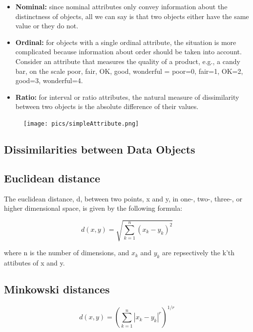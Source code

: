 		\begin{itemize}
			\item{\bf Nominal:} since nominal attributes only convey information about
			the distinctness of objects, all we can say is that two objects either have the
			same value or they do not.
			\item{\bf Ordinal:} for objects with a single ordinal attribute, the situation
			is more complicated because information about order should be taken into account.
			Consider an attribute that measures the quality of a product, e.g., a candy bar, 
			on the scale {poor, fair, OK, good, wonderful} = {poor=0, fair=1, OK=2, good=3, 
			wonderful=4}.
			\item{\bf Ratio:} for interval or ratio attributes, the natural measure of dissimilarity
			between two objects is the absolute difference of their values.
		\end{itemize}

		\begin{figure}[H]
			\texttt{[image: pics/simpleAttribute.png]}
		\end{figure}

	\subsection{Dissimilarities between Data Objects}

	\subsection*{Euclidean distance} 

	The euclidean distance, d, between two points, x and y,
	in one-, two-, three-, or higher dimensional space, is given by the following formula:

		\begin{equation}
		d(x,y) = \sqrt{\sum_{k=1}^{n} (x_k - y_k)^{2}}
		\end{equation}
	

	where n is the number of dimensions, and $x_{k}$ and $y_{k}$ are repsectively the k'th attibutes
	of x and y. 


	\subsection*{Minkowski distances}

		\begin{equation}
			d(x,y) = \left(\sum_{k=1}^{n} |x_k - y_k|^{r}\right) ^{1/r}
		\end{equation}

